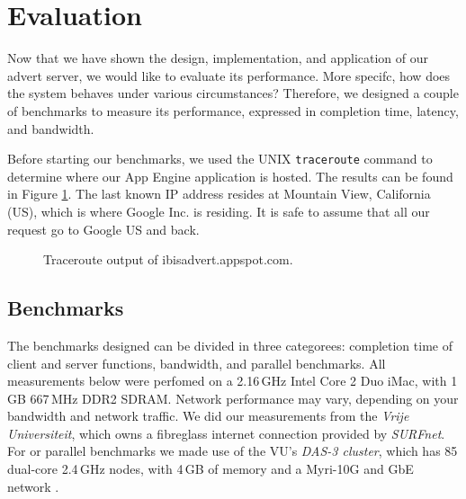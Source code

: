 \section{Evaluation}
\label{evaluation}
Now that we have shown the design, implementation, and application of our advert
server, we would like to evaluate its performance. More specifc, how does the
system behaves under various circumstances? Therefore, we designed a couple of
benchmarks to measure its performance, expressed in completion time, latency,
and bandwidth.

Before starting our benchmarks, we used the UNIX \texttt{traceroute} command to
determine where our App Engine application is hosted. The results can be found in
Figure \ref{tracert}. The last known IP address resides at Mountain View,
California (US), which is where Google Inc. is residing. It is safe to assume
that all our request go to Google US and back.

\begin{figure} %
\begin{center}
\caption{Traceroute output of ibisadvert.appspot.com.\label{tracert}}
\end{center}
\end{figure}

\subsection{Benchmarks}
The benchmarks designed can be divided in three categorees: completion time of
client and server functions, bandwidth, and parallel benchmarks. All measurements
below were perfomed on a 2.16\,GHz Intel Core 2 Duo iMac, with 1\,GB 667\,MHz
DDR2 SDRAM. Network performance may vary, depending on your bandwidth and network
traffic. We did our measurements from the \emph{Vrije Universiteit}, which owns a
fibreglass internet connection provided by \emph{SURFnet}. For or parallel
benchmarks we made use of the VU's \emph{DAS-3 cluster}, which has 85 dual-core
2.4\,GHz nodes, with 4\,GB of memory and a Myri-10G and GbE network \cite{das3-www}.

